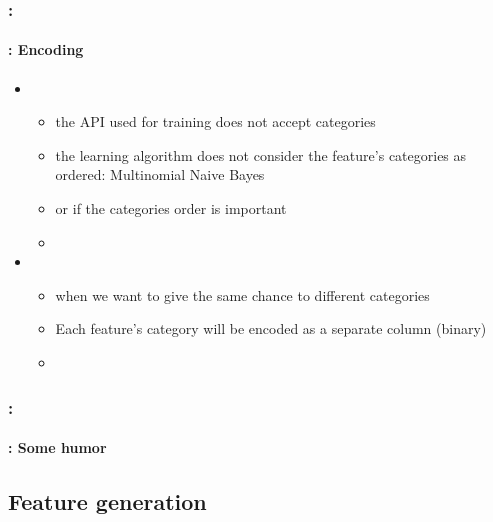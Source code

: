 \documentclass[xcolor=table]{beamer}
\begin{document}
\begin{frame}
	\frametitle{\insertshortsubtitle: \insertsection}
	\framesubtitle{\insertsubsection: Encoding}
	
	\begin{itemize}
		\item {}
		\begin{itemize}
			\item the API used for training does not accept categories
			\item the learning algorithm does not consider the feature's categories as ordered: Multinomial Naive Bayes
			\item or if the categories order is important
			\item {}
		\end{itemize}
	
		\item {}
		\begin{itemize}
			\item when we want to give the same chance to different categories
			\item Each feature's category will be encoded as a separate column (binary)
			\item {}
		\end{itemize}

	\end{itemize}
	
\end{frame}

\begin{frame}
	\frametitle{\insertshortsubtitle: \insertsection}
	\framesubtitle{\insertsubsection: Some humor}
	
	\begin{center}
	\end{center}
	
\end{frame}

\subsection{Feature generation}
\end{document}
